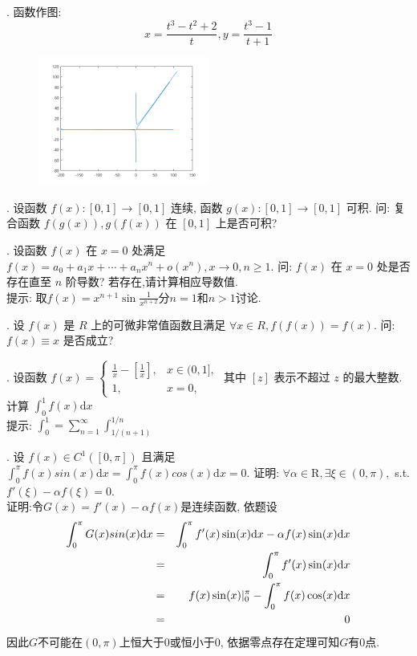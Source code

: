 \documentclass[a4paper,12pt]{article}
\begin{document}
. 函数作图:
\[
x = \frac{t^3-t^2+2}{t}, 
y = \frac{t^3-1}{t+1}
\]
\begin{figure}[htbp]
  \centering
  \includegraphics[width = 0.5\textwidth]{20180228_5.png}
  \caption{}
  \label{}
\end{figure}

. 设函数 $f(x):[0,1]\to [0,1]$ 连续, 函数 $g(x):[0,1]\to [0,1]$ 可积. 问: 复合函数 $f(g(x)),g(f(x))$ 在 $[0,1]$ 上是否可积?

. 设函数 $f(x)$ 在 $x=0$ 处满足 $f(x)=a_0+a_1x+\cdots+a_nx^n+o(x^n),x\to 0,n\geq1$. 问: $f(x)$ 在 $x=0$ 处是否存在直至 $n$ 阶导数? 若存在,请计算相应导数值.\\
提示: 取$f(x)=x^{n+1}\sin\frac{1}{x^{n+2}}$分$n=1$和$n>1$讨论.

. 设 $f(x)$ 是 $R$ 上的可微非常值函数且满足 $\forall x\in R, f(f(x))=f(x)$. 问: $f(x)\equiv x$ 是否成立?

. 设函数
\(
f(x)=\left\{\begin{array}{ll}
\frac{1}{x}-[\frac{1}{x}], & x\in(0,1],\\
1,                         & x=0,
\end{array}\right.
\)
其中 $[z]$ 表示不超过 $z$ 的最大整数. 计算 $\int_0^1f(x)\mathrm{d}x$\\
提示: $\int_0^1=\sum_{n=1}^{\infty}\int_{1/(n+1)}^{1/n}$

. 设 $f(x)\in C^1([0,\pi])$ 且满足 $\int_0^\pi f(x)sin(x)\mathrm{d}x=\int_0^\pi f(x)cos(x)\mathrm{d}x=0$. 证明: 
$\forall \alpha \in \mathrm{R}, \exists \xi \in (0,\pi), $ s.t. $ f'(\xi)-\alpha f(\xi)=0$.\\
证明:令$G(x)=f'(x)-\alpha f(x)$是连续函数, 依题设
\begin{eqnarray*}
  \int_0^\pi G(x)sin(x)\mathrm{d} x&=&\int_0^\pi f'(x)\sin(x)\mathrm{d} x-\alpha f(x)\sin(x)\mathrm{d} x\\
  &=&\int_0^\pi f'(x)\sin(x)\mathrm{d} x\\
  &=&f(x)\sin(x)\vert_0^\pi-\int_0^\pi f(x)\cos(x)\mathrm{d} x\\
  &=&0
\end{eqnarray*}
因此$G$不可能在$(0,\pi)$上恒大于0或恒小于0, 依据零点存在定理可知$G$有0点.
\end{document}
